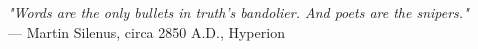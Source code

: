 \begin{flushright}
\emph{"Words are the only bullets in truth's bandolier. And poets are the snipers."}\\
— Martin Silenus, circa 2850 A.D., Hyperion
\end{flushright}
